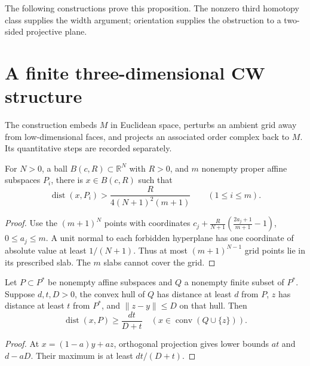 The following constructions prove this proposition. The nonzero third
homotopy class supplies the width argument; orientation supplies the
obstruction to a two-sided projective plane.

\section{A finite three-dimensional CW structure}
\label{sec:foundations-triangulation}

The construction embeds $M$ in Euclidean space, perturbs an ambient grid
away from low-dimensional faces, and projects an associated order complex
back to $M$. Its quantitative steps are recorded separately.

\begin{lemma}
\label{lem:foundations-affine-avoidance}
For $N>0$, a ball $B(c,R)\subset\mathbb R^N$ with $R>0$, and
$m$ nonempty proper affine subspaces $P_i$, there is $x\in B(c,R)$
such that
\[
 \operatorname{dist}(x,P_i)>
 \frac{R}{4(N+1)^2(m+1)}\qquad(1\leq i\leq m).
\]
\end{lemma}
\begin{proof}
Use the $(m+1)^N$ points with coordinates
$c_j+\frac{R}{N+1}(\frac{2a_j+1}{m+1}-1)$,
$0\leq a_j\leq m$. A unit normal to each forbidden hyperplane has
one coordinate of absolute value at least $1/(N+1)$. Thus at most
$(m+1)^{N-1}$ grid points lie in its prescribed slab. The $m$ slabs
cannot cover the grid.
\end{proof}

\begin{lemma}
\label{lem:foundations-join-clearance}
Let $P\subset P^*$ be nonempty affine subspaces and $Q$ a nonempty
finite subset of $P^*$. Suppose $d,t,D>0$, the convex hull of $Q$
has distance at least $d$ from $P$, $z$ has distance at least $t$ from
$P^*$, and $\|z-y\|\leq D$ on that hull. Then
\[
 \operatorname{dist}(x,P)\geq\frac{dt}{D+t}
 \quad(x\in\operatorname{conv}(Q\cup\{z\})).
\]
\end{lemma}
\begin{proof}
At $x=(1-a)y+az$, orthogonal projection gives lower bounds $at$ and
$d-aD$. Their maximum is at least $dt/(D+t)$.
\end{proof}

